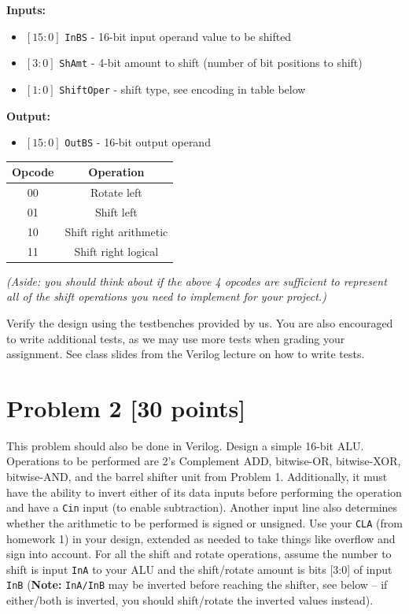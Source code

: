 \documentclass[12pt]{article}
\begin{document}
\textbf{Inputs:}
\begin{itemize}
\item $[15:0]$ \texttt{InBS} - 16-bit input operand value to be shifted
\item $[3:0]$ \texttt{ShAmt} - 4-bit amount to shift (number of bit positions to shift)
\item $[1:0]$ \texttt{ShiftOper} - shift type, see encoding in table below
\end{itemize}
\textbf{Output:}
\begin{itemize}
\item $[15:0]$ \texttt{OutBS} - 16-bit output operand
\end{itemize}
\begin{center}
\begin{tabular}{|c|c|} \hline 
Opcode & Operation \\ \hline
00 & Rotate left \\ \hline
01 & Shift left \\ \hline
10 & Shift right arithmetic \\ \hline
11 & Shift right logical \\ \hline
\end{tabular}
\end{center}
\textit{(Aside: you should think about if the above 4 opcodes are sufficient to represent all of the shift operations
you need to implement for your project.)}

Verify the design using the testbenches provided by us.  You are also encouraged to write additional tests, as we may use
more tests when grading your assignment.  See class slides from the Verilog lecture on how to write tests.

\section*{Problem 2 [30 points]}

This problem should also be done in Verilog. Design a simple 16-bit ALU. Operations to be performed are
2's Complement ADD, bitwise-OR, bitwise-XOR, bitwise-AND, and the barrel shifter unit from Problem
1. Additionally, it must have the ability to invert either of its data inputs before performing the operation
and have a \texttt{Cin} input (to enable subtraction). Another input line also determines whether the arithmetic to
be performed is signed or unsigned. Use your \texttt{CLA} (from homework 1) in your design, extended as needed
to take things like overflow and sign into account. For all the shift and rotate operations, assume the number
to shift is input \texttt{InA} to your ALU and the shift/rotate amount is bits [3:0] of input \texttt{InB} (\textbf{Note:} \texttt{InA/InB} may
be inverted before reaching the shifter, see below – if either/both is inverted, you should shift/rotate the
inverted values instead).
\end{document}
